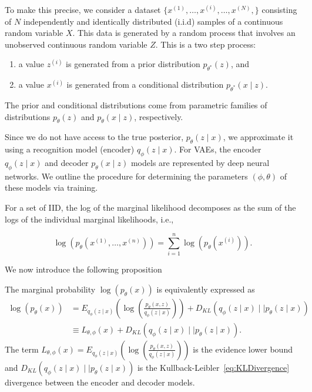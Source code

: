 \documentclass[11pt]{article}
\begin{document}
To make this precise, we consider a dataset $\{x^{(1)},\ldots,x^{(i)},\ldots, x^{(N)}, \}$ consisting of $N$ independently and identically distributed (i.i.d) samples of a continuous random variable $X$. This data is generated by a random process that involves an unobserved continuous random variable $Z$. This is a two step process:
\begin{enumerate}
    \item a value $z^{(i)}$ is generated from a prior distribution $p_{\theta^{*}}(z)$, and
    \item a value $x^{(i)}$ is generated from a conditional distribution $p_{\theta^{*}}(x\mid z)$.
\end{enumerate}
The prior and conditional distributions come from parametric families of distributions $p_{\theta}(z)$ and $p_{\theta}(x\mid z)$, respectively.

Since we do not have access to the true posterior, $p_{\theta}(z\mid x)$, we approximate it using a recognition model (encoder) $q_{\phi}(z\mid x)$. For VAEs, the encoder $q_{\phi}(z\mid x)$ and decoder $p_{\theta}(x\mid z)$ models are represented by deep neural networks. We outline the procedure for determining the parameters $(\phi, \theta)$ of these models via training.

For a set of IID, the log of the marginal likelihood decomposes as the sum of the logs of the individual marginal likelihoods, i.e.,

\begin{equation}
    \log(p_{\theta}(x^{(1)},\ldots, x^{(n)})) = \sum_{i=1}^{n}\log(p_{\theta}(x^{(i)})).
\end{equation}

We now introduce the following proposition

\begin{proposition}
    The marginal probability $\log(p_{\theta}(x))$ is equivalently expressed as
    \begin{align}
        \log(p_{\theta}(x)) &= E_{q_{\phi}(z\mid x)}\left(\log\left(\frac{p_{\theta}(x,z)}{q_{\phi}(z\mid x)}\right) \right) + D_{KL}(q_{\phi}(z\mid x) \mid\mid p_{\theta}(z\mid x)) \\
        &\equiv L_{\theta,\phi}(x) +  D_{KL}(q_{\phi}(z\mid x) \mid\mid p_{\theta}(z\mid x)). 
    \end{align}
The term $ L_{\theta,\phi}(x) = E_{q_{\phi}(z\mid x)}\left(\log\left(\frac{p_{\theta}(x,z)}{q_{\phi}(z\mid x)}\right) \right)$ is the evidence lower bound and $D_{KL}(q_{\phi}(z\mid x) \mid\mid p_{\theta}(z\mid x))$ is the Kullback-Leibler~\eqref{eq:KLDivergence} divergence between the encoder and decoder models.
\end{proposition}
\end{document}
